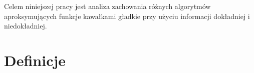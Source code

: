 \documentclass[oik, pdftex, robocza, man]{mgrwms}
\begin{document}
\begin{wstep}    %
    Celem niniejszej pracy jest analiza zachowania różnych algorytmów aproksymujących funkcje kawałkami gładkie przy użyciu informacji dokładniej i niedokładniej.



\end{wstep}



\chapter{Definicje}
\end{document}
